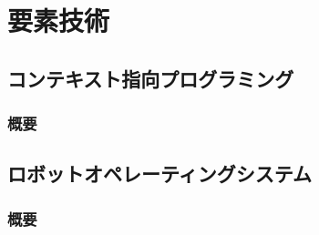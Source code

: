 
\chapter{要素技術}
\label{cha:element_technology}

\section{コンテキスト指向プログラミング}
\subsection{概要}

\section{ロボットオペレーティングシステム}
\subsection{概要}


